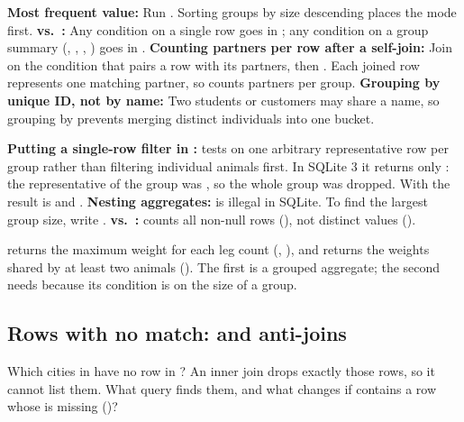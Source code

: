 \documentclass[10pt]{scrartcl}
\begin{document}
\begin{shortcuts}
  \ii \textbf{Most frequent value:} Run . Sorting groups by size descending places the mode first.
  \ii \textbf{ vs.\ :} Any condition on a single row goes in ; any condition on a group summary (, , , ) goes in .
  \ii \textbf{Counting partners per row after a self-join:} Join on the condition that pairs a row with its partners, then . Each joined row represents one matching partner, so  counts partners per group.
  \ii \textbf{Grouping by unique ID, not by name:} Two students or customers may share a name, so grouping by  prevents merging distinct individuals into one bucket.
\end{shortcuts}

\begin{trapbox}
  \ii \textbf{Putting a single-row filter in :}  tests  on one arbitrary representative row per group rather than filtering individual animals first. In SQLite 3 it returns only : the representative of the  group was , so the whole group was dropped. With  the result is  and .
  \ii \textbf{Nesting aggregates:}  is illegal in SQLite. To find the largest group size, write .
  \ii \textbf{ vs.\ :}  counts all non-null rows (), not distinct values ().
\end{trapbox}

\revisit {} returns the maximum weight for each leg count (, ), and  returns the weights shared by at least two animals (). The first is a grouped aggregate; the second needs  because its condition is on the size of a group.

\subsection{Rows with no match:  and anti-joins}

\begin{qbox}
  Which cities in  have no row in ? An inner join drops exactly those rows, so it cannot list them. What query finds them, and what changes if  contains a row whose  is missing ()?
\end{qbox}
\end{document}
